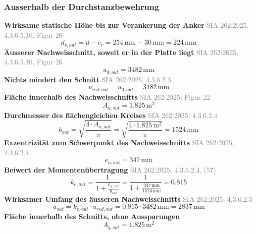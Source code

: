 \documentclass[11pt,a4paper]{article}
\newcommand{\normref}[1]{{\small\textcolor{gray}{#1}}}
\begin{document}
\subsubsection{Ausserhalb der Durchstanzbewehrung}
\noindent\textbf{Wirksame statische Höhe bis zur Verankerung der Anker} \hfill \normref{SIA 262:2025, 4.3.6.5.10, Figur 26}
\begin{equation*}
d_{v,out} = d - c_v = 254\,\mathrm{mm} - 30\,\mathrm{mm} = 224\,\mathrm{mm}
\end{equation*}
\noindent\textbf{Äusserer Nachweisschnitt, soweit er in der Platte liegt} \hfill \normref{SIA 262:2025, 4.3.6.5.10, Figur 26}
\begin{equation*}
u_{0,out} = 3482\,\mathrm{mm}
\end{equation*}
\noindent\textbf{Nichts mindert den Schnitt} \hfill \normref{SIA 262:2025, 4.3.6.2.3}
\begin{equation*}
u_{red,out} = u_{0,out} = 3482\,\mathrm{mm}
\end{equation*}
\noindent\textbf{Fläche innerhalb des Nachweisschnitts} \hfill \normref{SIA 262:2025, Figur 22}
\begin{equation*}
A_{u,out} = 1.825\,\mathrm{m}^{2}
\end{equation*}
\noindent\textbf{Durchmesser des flächengleichen Kreises} \hfill \normref{SIA 262:2025, 4.3.6.2.4}
\begin{equation*}
b_{out} = \sqrt{\frac{4 \cdot A_{u,out}}{\pi}} = \sqrt{\frac{4 \cdot 1.825\,\mathrm{m}^{2}}{\pi}} = 1524\,\mathrm{mm}
\end{equation*}
\noindent\textbf{Exzentrizität zum Schwerpunkt des Nachweisschnitts} \hfill \normref{SIA 262:2025, 4.3.6.2.4}
\begin{equation*}
e_{u,out} = 347\,\mathrm{mm}
\end{equation*}
\noindent\textbf{Beiwert der Momentenübertragung} \hfill \normref{SIA 262:2025, 4.3.6.2.4, (57)}
\begin{equation*}
k_{e,out} = \frac{1}{1 + \frac{e_{u,out}}{b_{out}}} = \frac{1}{1 + \frac{347\,\mathrm{mm}}{1524\,\mathrm{mm}}} = 0.815
\end{equation*}
\noindent\textbf{Wirksamer Umfang des äusseren Nachweisschnitts} \hfill \normref{SIA 262:2025, 4.3.6.2.3}
\begin{equation*}
u_{out} = k_{e,out} \cdot u_{red,out} = 0.815 \cdot 3482\,\mathrm{mm} = 2837\,\mathrm{mm}
\end{equation*}
\noindent\textbf{Fläche innerhalb des Schnitts, ohne Aussparungen}
\begin{equation*}
A_{q,out} = 1.825\,\mathrm{m}^{2}
\end{equation*}
\end{document}
